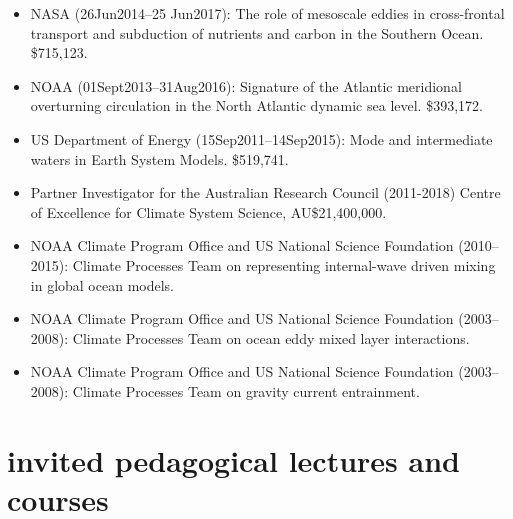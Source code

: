 \documentclass{article}
\begin{document}
\begin{itemize}[leftmargin=*]
\item NASA (26Jun2014--25 Jun2017): The role of mesoscale eddies in cross-frontal transport and subduction of nutrients and carbon in
  the Southern Ocean.  \$715,123.

\item NOAA (01Sept2013--31Aug2016): Signature of the Atlantic meridional overturning circulation in the North Atlantic dynamic sea
  level.  \$393,172.

\item US Department of Energy (15Sep2011--14Sep2015): Mode and intermediate waters in Earth System Models. \$519,741.

\item Partner Investigator for the Australian Research Council (2011-2018) Centre of Excellence for Climate System Science, AU\$21,400,000.
  
\item NOAA Climate Program Office and US National Science Foundation (2010--2015): Climate Processes Team on representing internal-wave driven mixing in global ocean models.

\item NOAA Climate Program Office and US National Science Foundation (2003--2008): Climate Processes Team on ocean eddy mixed layer
  interactions.

\item NOAA Climate Program Office and US National Science Foundation (2003--2008): Climate Processes Team on gravity current entrainment.



\end{itemize}


\section*{\sc  \color{Maroon}  invited pedagogical lectures and courses}
\vspace{-.3cm}
\end{document}

